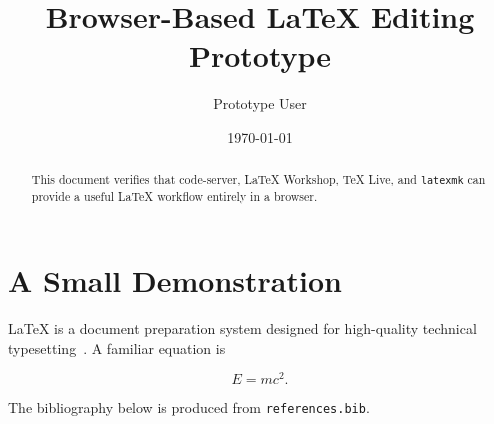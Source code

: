 \documentclass[11pt]{article}
\title{Browser-Based LaTeX Editing Prototype}
\author{Prototype User}
\date{\today}
\begin{document}
\maketitle

\begin{abstract}
This document verifies that code-server, LaTeX Workshop, TeX Live, and
\texttt{latexmk} can provide a useful LaTeX workflow entirely in a browser.
\end{abstract}

\section{A Small Demonstration}

LaTeX is a document preparation system designed for high-quality technical
typesetting~\cite{lamport1994latex}. A familiar equation is

\begin{equation}
  E = mc^2.
\end{equation}

The bibliography below is produced from \texttt{references.bib}.



\end{document}
